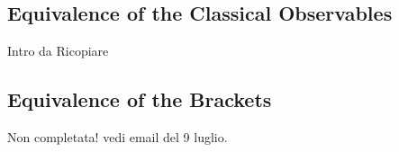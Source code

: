 \documentclass[Main]{subfiles}
\begin{document}
	\subsection{Equivalence of the Classical Observables}	
		\begin{Warning}
			Intro da Ricopiare
		\end{Warning}
	\subsection{Equivalence of the Brackets}	
		\begin{Warning}
			Non completata! vedi email del 9 luglio.
		\end{Warning}
\end{document}
